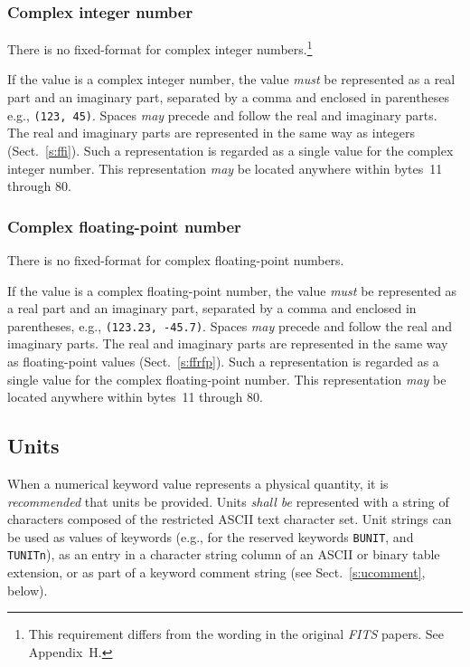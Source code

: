 \documentclass[onecolumn]{aa}
\begin{document}
   \subsubsection{Complex integer number}
   \label{s:ffci}
   There is no fixed-format for complex integer numbers.\footnote{This 
   requirement differs from the wording in the original 
{\em FITS\/} papers.  See Appendix~H.} 
     

   If the value is a complex integer number, the value {\em must} be 
   represented as a real part and an imaginary part,
   separated by a comma and enclosed in parentheses
   e.g., {\tt (123, 45)}.  Spaces {\em may} precede
   and follow the real and imaginary parts.  The real and imaginary
   parts are represented in the same way as integers (Sect.\ \ref{s:ffi}).
   Such a representation is
   regarded as a single value for the complex integer number.  This 
   representation {\em may} be located anywhere within bytes~11 through 80.

   \subsubsection{Complex floating-point number}
   \label{s:ffcfp}
   There is no fixed-format for complex floating-point numbers.\footnotemark[3]

   If the value is a complex floating-point number, the value {\em must} be 
   represented as a real part and an 
   imaginary part, 
   separated by a comma and enclosed in parentheses,
   e.g., {\tt (123.23, -45.7)}.  Spaces {\em may} precede
   and follow the real and imaginary parts.  The real and imaginary
   parts are represented in the same way as floating-point values (Sect.\ \ref{s:ffrfp}).
   Such a representation is
   regarded as a single value for the complex floating-point number.  This 
   representation {\em may} be located anywhere within bytes~11 through 80.

 \subsection{Units}
  \label{s:Units}

When a numerical keyword value represents a physical 
quantity, it is {\em recommended} that units be provided. Units 
{\em shall be} represented with a string of characters composed of 
the restricted ASCII text character set. Unit strings can be used as 
values of keywords 
(e.g., for the reserved keywords {\tt BUNIT}, and {\tt TUNITn}), as an entry in
a character string column of an ASCII or binary table extension,  or 
as part of a keyword comment string (see Sect.\ \ref{s:ucomment}, below). 
\end{document}
